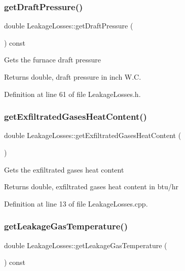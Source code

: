 \subsubsection{\texorpdfstring{get\+Draft\+Pressure()}{getDraftPressure()}}
{\footnotesize\ttfamily double Leakage\+Losses\+::get\+Draft\+Pressure (\begin{DoxyParamCaption}{ }\end{DoxyParamCaption}) const\hspace{0.3cm}{\ttfamily [inline]}}

Gets the furnace draft pressure

\begin{DoxyReturn}{Returns}
double, draft pressure in inch W.\+C. 
\end{DoxyReturn}


Definition at line 61 of file Leakage\+Losses.\+h.

\mbox{\label{class_leakage_losses_a9663b916752bcf39a5482674e225e4a5}} 
\subsubsection{\texorpdfstring{get\+Exfiltrated\+Gases\+Heat\+Content()}{getExfiltratedGasesHeatContent()}}
{\footnotesize\ttfamily double Leakage\+Losses\+::get\+Exfiltrated\+Gases\+Heat\+Content (\begin{DoxyParamCaption}{ }\end{DoxyParamCaption})}

Gets the exfiltrated gases heat content

\begin{DoxyReturn}{Returns}
double, exfiltrated gases heat content in btu/hr 
\end{DoxyReturn}


Definition at line 13 of file Leakage\+Losses.\+cpp.

\mbox{\label{class_leakage_losses_a5dbb249c07bc91611b71d62610af7234}} 
\subsubsection{\texorpdfstring{get\+Leakage\+Gas\+Temperature()}{getLeakageGasTemperature()}}
{\footnotesize\ttfamily double Leakage\+Losses\+::get\+Leakage\+Gas\+Temperature (\begin{DoxyParamCaption}{ }\end{DoxyParamCaption}) const\hspace{0.3cm}{\ttfamily [inline]}}

